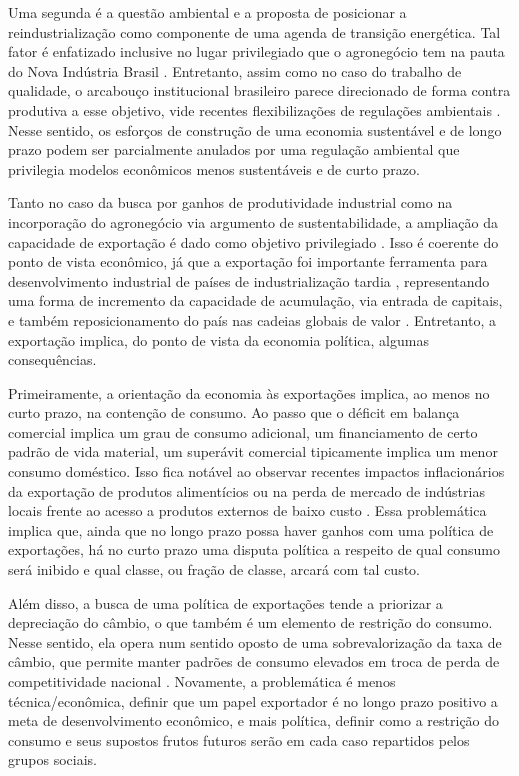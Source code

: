 Uma segunda é a questão ambiental e a proposta de posicionar a
reindustrialização como componente de uma agenda de transição
energética. Tal fator é enfatizado inclusive no lugar privilegiado que o
agronegócio tem na pauta do Nova Indústria Brasil \citep{cndi_nova_2024}.
Entretanto, assim como no caso do trabalho de qualidade, o arcabouço
institucional brasileiro parece direcionado de forma contra produtiva a
esse objetivo, vide recentes flexibilizações de regulações ambientais
. Nesse sentido, os esforços de construção de uma economia
sustentável e de longo prazo podem ser parcialmente anulados por uma
regulação ambiental que privilegia modelos econômicos menos sustentáveis
e de curto prazo.

Tanto no caso da busca por ganhos de produtividade industrial como na
incorporação do agronegócio via argumento de sustentabilidade, a
ampliação da capacidade de exportação é dado como objetivo privilegiado
\citep{cndi_nova_2024}. Isso é coerente do ponto de vista econômico, já que
a exportação foi importante ferramenta para desenvolvimento industrial
de países de industrialização tardia , representando uma
forma de incremento da capacidade de acumulação, via entrada de
capitais, e também reposicionamento do país nas cadeias globais de valor
. Entretanto, a
exportação implica, do ponto de vista da economia política, algumas
consequências.

Primeiramente, a orientação da economia às exportações implica, ao menos
no curto prazo, na contenção de consumo. Ao passo que o déficit em
balança comercial implica um grau de consumo adicional, um financiamento
de certo padrão de vida material, um superávit comercial tipicamente
implica um menor consumo doméstico. Isso fica notável ao observar
recentes impactos inflacionários da exportação de produtos alimentícios
 ou na perda de mercado de indústrias locais frente ao
acesso a produtos externos de baixo custo . Essa
problemática implica que, ainda que no longo prazo possa haver ganhos
com uma política de exportações, há no curto prazo uma disputa política
a respeito de qual consumo será inibido e qual classe, ou fração de
classe, arcará com tal custo.

Além disso, a busca de uma política de exportações tende a priorizar a
depreciação do câmbio, o que também é um elemento de restrição do
consumo. Nesse sentido, ela opera num sentido oposto de uma
sobrevalorização da taxa de câmbio, que permite manter padrões de
consumo elevados em troca de perda de competitividade nacional . Novamente, a problemática é menos técnica/econômica,
definir que um papel exportador é no longo prazo positivo a meta de
desenvolvimento econômico, e mais política, definir como a restrição do
consumo e seus supostos frutos futuros serão em cada caso repartidos
pelos grupos sociais.

